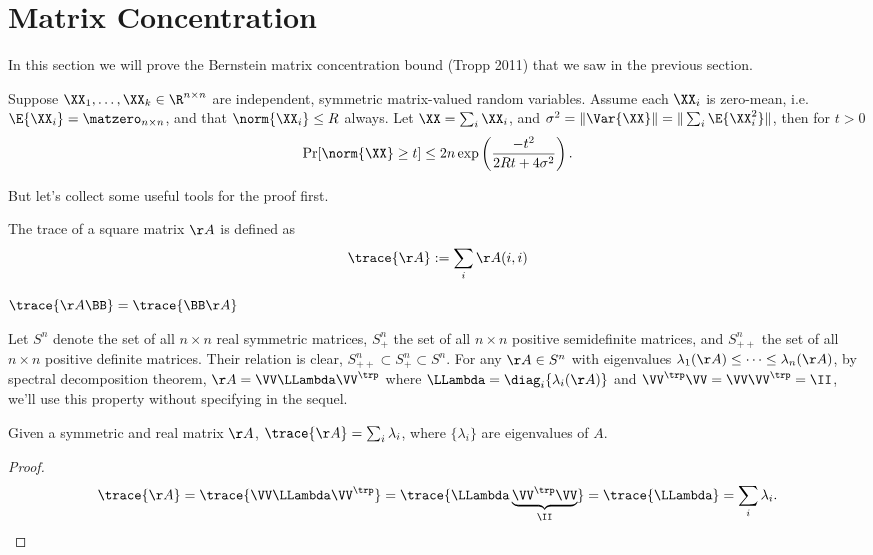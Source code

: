 \section{Matrix Concentration}
In this section we will prove the Bernstein matrix concentration bound
(Tropp 2011) that we saw in the previous section.
\begin{theorem}\label{thm:matbernstein}
  Suppose $\XX_1, \ldots, \XX_k \in \R^{n \times n}$ are independent, symmetric matrix-valued random variables.
  Assume each $\XX_i$ is zero-mean, i.e. $\E{\XX_i} = \matzero_{n \times
  n}$, and that $\norm{\XX_i} \leq R$ always.
  Let $\XX = \sum_i \XX_i$, and $\sigma^2 = \|\Var{\XX}\| = \|\sum_i \E{\XX_i^2}\|$, then for $t > 0$
  \[
  \Pr[ \norm{\XX} \geq t] \leq 2n\exp\left(\frac{-t^2}{2Rt + 4\sigma^2}\right).
  \]
\end{theorem}
But let's collect some useful tools for the proof first.

\begin{definition}[trace]
  The trace of a square matrix $\AA$ is defined as
  \[ \trace{\AA} := \sum_{i} \AA(i,i) \]
\end{definition}

\begin{claim}
  $\trace{\AA\BB} = \trace{\BB\AA}$
\end{claim}

Let $S^n$ denote the set of all $n\times n$ real symmetric matrices,
$S^n_+$ the set of all $n\times n$ positive semidefinite matrices,
and $S^n_{++}$ the set of all $n\times n$ positive definite matrices.
Their relation is clear, $S^n_{++} \subset S^n_+ \subset S^n$.
For any $\AA\in S^n$ with eigenvalues $\lambda_1(\AA)\leq\cdots\leq\lambda_n(\AA)$, by spectral decomposition theorem, $\AA = \VV\LLambda\VV^\trp$ where $\LLambda=\diag_i\{\lambda_i(\AA)\}$ and $\VV^\trp\VV=\VV\VV^\trp=\II$,
we'll use this property without specifying in the sequel.

\begin{claim}\label{clm:tr_eq_sum_eigen}
  Given a symmetric and real matrix $\AA$, $\trace{\AA} = \sum_{i}\lambda_i$, where $\{\lambda_i\}$ are eigenvalues of $A$.
\end{claim}
\begin{proof}
  \[ \trace{\AA} = \trace{\VV\LLambda\VV^\trp} = \trace{\LLambda\underbrace{\VV^\trp\VV}_{\II}} = \trace{\LLambda} = \sum_i \lambda_i. \]
\end{proof}

